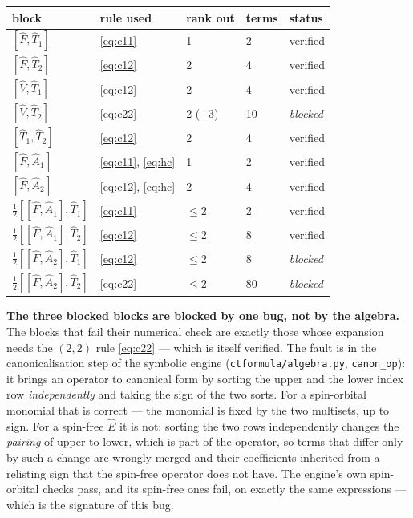 \documentclass[11pt]{article}
\begin{document}
\begin{center}
\footnotesize
\begin{tabular}{@{}p{4.4cm}p{3.2cm}p{1.6cm}p{1.5cm}p{3.6cm}@{}}
\toprule
block & rule used & rank out & terms & status \\
\midrule
$[\hat F,\hat T_1]$ & \eqref{eq:c11} & 1 & 2 & verified \\
$[\hat F,\hat T_2]$ & \eqref{eq:c12} & 2 & 4 & verified \\
$[\hat V,\hat T_1]$ & \eqref{eq:c12} & 2 & 4 & verified \\
$[\hat V,\hat T_2]$ & \eqref{eq:c22} & 2 (+3) & 10 & \emph{blocked} \\
$[\hat T_1,\hat T_2]$ & \eqref{eq:c12} & 2 & 4 & verified \\
\midrule
$[\hat F,\hat A_1]$ & \eqref{eq:c11}, \eqref{eq:hc} & 1 & 2 & verified \\
$[\hat F,\hat A_2]$ & \eqref{eq:c12}, \eqref{eq:hc} & 2 & 4 & verified \\
$\tfrac12[[\hat F,\hat A_1],\hat T_1]$ & \eqref{eq:c11} & $\le2$ & 2 & verified \\
$\tfrac12[[\hat F,\hat A_1],\hat T_2]$ & \eqref{eq:c12} & $\le2$ & 8 & verified \\
$\tfrac12[[\hat F,\hat A_2],\hat T_1]$ & \eqref{eq:c12} & $\le2$ & 8 & \emph{blocked} \\
$\tfrac12[[\hat F,\hat A_2],\hat T_2]$ & \eqref{eq:c22} & $\le2$ & 80 & \emph{blocked} \\
\bottomrule
\end{tabular}
\end{center}

\noindent
\textbf{The three blocked blocks are blocked by one bug, not by the algebra.}
The blocks that fail their numerical check are exactly those whose expansion
needs the $(2,2)$ rule \eqref{eq:c22} --- which is itself verified. The fault is
in the canonicalisation step of the symbolic engine
(\texttt{ctformula/algebra.py}, \texttt{canon\_op}): it brings an operator to
canonical form by sorting the upper and the lower index row \emph{independently}
and taking the sign of the two sorts. For a spin-orbital monomial that is
correct --- the monomial is fixed by the two multisets, up to sign. For a
spin-free $\hat E$ it is not: sorting the two rows independently changes the
\emph{pairing} of upper to lower, which is part of the operator, so terms that
differ only by such a change are wrongly merged and their coefficients
inherited from a relisting sign that the spin-free operator does not have. The
engine's own spin-orbital checks pass, and its spin-free ones fail, on exactly
the same expressions --- which is the signature of this bug.
\end{document}
